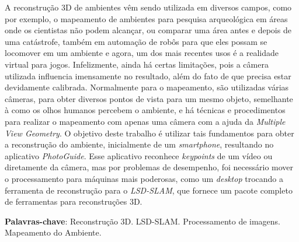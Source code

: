 \setlength{\absparsep}{18pt} %
\begin{resumo}
A reconstrução 3D de ambientes vêm sendo utilizada em diversos campos, como por exemplo, o mapeamento de ambientes para pesquisa arqueológica em áreas onde os cientistas não podem alcançar, ou comparar uma área antes e depois de uma catástrofe\cite{SLAMAP}, também em automação de robôs para que eles possam se locomover em um ambiente e agora, um dos mais recentes usos é a realidade virtual para jogos. Infelizmente, ainda há certas limitações, pois a câmera utilizada influencia imensamente no resultado, além do fato de que precisa estar devidamente calibrada. Normalmente para o mapeamento, são utilizadas várias câmeras, para obter diversos pontos de vista para um mesmo objeto, semelhante à como os olhos humanos percebem o ambiente, e há técnicas e procedimentos para realizar o mapeamento com apenas uma câmera com a ajuda da \textit{Multiple View Geometry}. O objetivo deste trabalho é utilizar tais fundamentos para obter a reconstrução do ambiente, inicialmente de um \textit{smartphone}, resultando no aplicativo \textit{PhotoGuide}. Esse aplicativo reconhece \textit{keypoints} de um vídeo ou diretamente da câmera, mas por problemas de desempenho, foi necessário mover o processamento para máquinas mais poderosas, como um \textit{desktop} trocando a ferramenta de reconstrução para o \textit{LSD-SLAM}, que fornece um pacote completo de ferramentas para reconstruções 3D. 

 \textbf{Palavras-chave}: Reconstrução 3D. LSD-SLAM. Processamento de imagens. Mapeamento do Ambiente.

\end{resumo}
